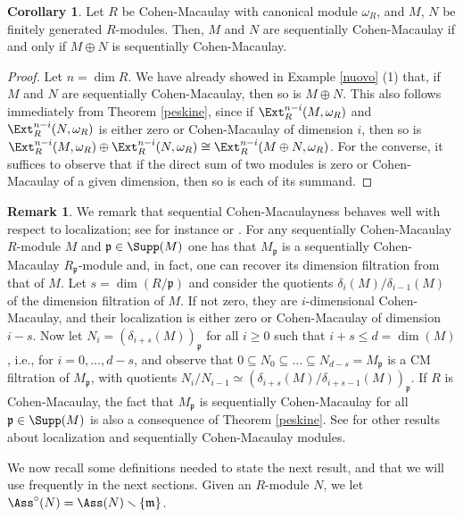 \documentclass[12pt]{amsart}
\theoremstyle{definition}
\newtheorem{corollary}[theorem]{Corollary}
\theoremstyle{definition}
\newtheorem{remark}[theorem]{Remark}
\newcommand{\m}{\mathfrak{m}}
\def\frk{\mathfrak}               %
\def\pp{{\frk p}}
\renewcommand{\leq}{\leqslant}
\renewcommand{\geq}{\geqslant}
\begin{document}
\begin{corollary}\label{sumviceversa} Let $R$ be Cohen-Macaulay with canonical module $\omega_R$, and  $M$, $N$ be finitely generated $R$-modules. Then, $M$ and $N$ are sequentially Cohen-Macaulay if and only if $M \oplus N$ is sequentially Cohen-Macaulay.
\end{corollary}
\begin{proof}
Let $n=\dim R$. We have already showed in Example \ref{nuovo} (1) that, if $M$ and $N$ are sequentially Cohen-Macaulay, then so is $M \oplus N$. This also follows immediately from Theorem \ref{peskine}, since if $\Ext^{n-i}_R(M,\omega_R)$ and $\Ext^{n-i}_R(N,\omega_R)$ is either zero or Cohen-Macaulay of dimension $i$, then so is $\Ext^{n-i}_R(M,\omega_R) \oplus \Ext^{n-i}_R(N,\omega_R)  \cong \Ext^{n-i}_R(M \oplus N,\omega_R)$. For the converse, it suffices to observe that if the direct sum of two modules is zero or Cohen-Macaulay of a given dimension, then so is each of its  summand.
\end{proof}

\begin{remark}\label{loca}
We remark that sequential Cohen-Macaulayness behaves well with respect to localization; see for instance \cite[Proposition 4.7]{CN03} or \cite[Proposition 2.6]{CGT13}. For any sequentially Cohen-Macaulay $R$-module $M$ and $\pp\in \Supp(M)$ one has that $M_\pp$ is a sequentially Cohen-Macaulay $R_\pp$-module and, in fact, one can recover its dimension filtration from that of $M$. Let $s=\dim (R/\pp)$ and consider the quotients $\delta_i(M)/\delta_{i-1}(M)$ of the dimension filtration of $M$. If not zero, they are $i$-dimensional Cohen-Macaulay, and their localization is either zero or Cohen-Macaulay of dimension $i-s$. Now let $N_i=(\delta_{i+s}(M))_\pp$ for all $i \geq 0$ such that $i+s\leq d=\dim(M)$, i.e., for $i=0,\ldots,d-s$, and observe that $0\subseteq N_0 \subseteq \ldots \subseteq N_{d-s}=M_\pp$ is a CM filtration of $M_\pp$, with quotients $N_i/N_{i-1}\simeq (\delta_{i+s}(M)/\delta_{i+s-1}(M))_\pp$. If $R$ is Cohen-Macaulay, the fact that $M_\pp$ is sequentially Cohen-Macaulay for all $\pp \in \Supp(M)$ is also a consequence of Theorem \ref{peskine}. See \cite{TPDA18} for other results about localization and sequentially Cohen-Macaulay modules.
\end{remark}

We now recall some definitions needed to state the next result, and that we will use frequently in the next sections. Given an $R$-module $N$, we let $\Ass^\circ(N) = \Ass(N) \smallsetminus \{\m\}$.
\end{document}
